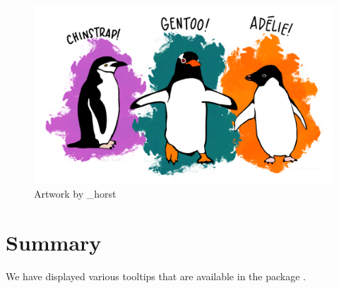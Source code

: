 \begin{Schunk}
\begin{figure}
\includegraphics[width=1\linewidth,height=0.3\textheight]{figures/penguins} \caption[Artwork by \@allison\_horst]{Artwork by \@allison\_horst}\label{fig:penguins-alison}
\end{figure}
\end{Schunk}

\hypertarget{summary}{%
\section{Summary}\label{summary}}

We have displayed various tooltips that are available in the package
.



\address{%
Quietest Quokka\\
University of Little Mates\\%
Department of Letter Q\\ Somewhere, Australia\\
%
\url{https://www.britannica.com/animal/quokka}\\%
\textit{ORCiD: \href{https://orcid.org/0000-1721-1511-1101}{0000-1721-1511-1101}}\\%
\href{mailto:qquo@ulm.edu}{\nolinkurl{qquo@ulm.edu}}%
}

\address{%
Bounciest Bilby\\
University of Little Mates\\%
Department of Letter B\\ Somewhere, Australia\\
%
\url{https://www.britannica.com/animal/bilby}\\%
\textit{ORCiD: \href{https://orcid.org/0000-0002-0912-0225}{0000-0002-0912-0225}}\\%
\href{mailto:bbil@ulm.edu}{\nolinkurl{bbil@ulm.edu}}%
}
